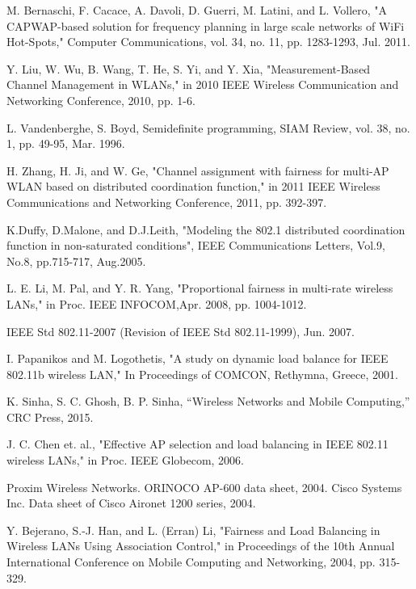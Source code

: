 \begin{thebibliography}{1}
 M. Bernaschi, F. Cacace, A. Davoli, D. Guerri, M. Latini, and L. Vollero, "A CAPWAP-based solution for frequency planning in large scale networks of WiFi Hot-Spots," Computer Communications, vol. 34, no. 11, pp. 1283-1293, Jul. 2011.

 Y. Liu, W. Wu, B. Wang, T. He, S. Yi, and Y. Xia, "Measurement-Based Channel Management in WLANs," in 2010 IEEE Wireless Communication and Networking Conference, 2010, pp. 1-6.

 L. Vandenberghe, S. Boyd, Semidefinite programming, SIAM Review, vol. 38, no. 1, pp. 49-95, Mar. 1996.

 H. Zhang, H. Ji, and W. Ge, "Channel assignment with fairness for multi-AP WLAN based on distributed coordination function," in 2011 IEEE Wireless Communications and Networking Conference, 2011, pp. 392-397.

 K.Duffy, D.Malone, and D.J.Leith, "Modeling the 802.1 distributed coordination function in non-saturated conditions", IEEE Communications Letters, Vol.9, No.8, pp.715-717, Aug.2005.

 L. E. Li, M. Pal, and Y. R. Yang, "Proportional fairness in multi-rate wireless LANs," in Proc. IEEE INFOCOM,Apr. 2008, pp. 1004-1012.


 IEEE Std 802.11-2007 (Revision of IEEE Std 802.11-1999), Jun. 2007.

 I. Papanikos and M. Logothetis, "A study on dynamic load balance for IEEE 802.11b wireless LAN," In Proceedings of COMCON, Rethymna, Greece, 2001.

 K. Sinha, S. C. Ghosh, B. P. Sinha, “Wireless Networks and Mobile Computing,” CRC Press, 2015.

 J. C. Chen et. al., "Effective AP selection and load balancing in IEEE 802.11 wireless LANs," in Proc. IEEE Globecom, 2006.

 Proxim Wireless Networks. ORINOCO AP-600 data sheet, 2004.
 Cisco Systems Inc. Data sheet of Cisco Aironet 1200 series, 2004. 

Y. Bejerano, S.-J. Han, and L. (Erran) Li, "Fairness and Load Balancing in Wireless LANs Using Association Control," in Proceedings of the 10th Annual International Conference on Mobile Computing and Networking, 2004, pp. 315-329.



\end{thebibliography}
